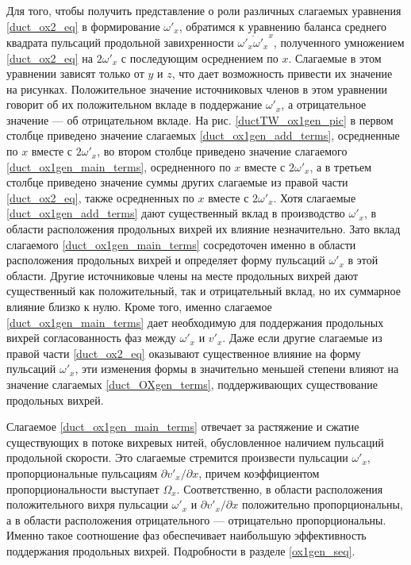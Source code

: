 Для того, чтобы получить представление о роли различных слагаемых уравнения \eqref{duct_ox2_eq} в формирование $\omega'_x$, обратимся к уравнению баланса среднего квадрата пульсаций продольной завихренности $\overline{\omega'_x \omega'_x}^x$, полученного умножением \eqref{duct_ox2_eq} на $2\omega'_x$ с последующим осреднением по $x$. Слагаемые в этом уравнении зависят только от $y$ и $z$, что дает возможность привести их значение на рисунках. Положительное значение источниковых членов в этом уравнении говорит об их положительном вкладе в поддержание $\omega'_x$, а отрицательное значение --- об отрицательном вкладе. На рис. \ref{ductTW_ox1gen_pic} в первом столбце приведено значение слагаемых \eqref{duct_ox1gen_add_terms}, осредненные по $x$ вместе с $2\omega'_x$, во втором столбце приведено значение слагаемого \eqref{duct_ox1gen_main_terms}, осредненного по $x$ вместе с $2\omega'_x$, а в третьем столбце приведено значение суммы других слагаемые из правой части \eqref{duct_ox2_eq}, также осредненных по $x$ вместе с $2\omega'_x$. Хотя слагаемые \eqref{duct_ox1gen_add_terms} дают существенный вклад в производство $\omega'_x$, в области расположения продольных вихрей их влияние незначительно. Зато вклад слагаемого \eqref{duct_ox1gen_main_terms} сосредоточен именно в области расположения продольных вихрей и определяет форму пульсаций $\omega'_x$ в этой области. Другие источниковые члены на месте продольных вихрей дают существенный как положительный, так и отрицательный вклад, но их суммарное влияние близко к нулю. Кроме того, именно слагаемое \eqref{duct_ox1gen_main_terms} дает необходимую для поддержания продольных вихрей согласованность фаз между $\omega'_x$ и $v'_x$. Даже если другие слагаемые из правой части \eqref{duct_ox2_eq} оказывают существенное влияние на форму пульсаций $\omega'_x$, эти изменения формы в значительно меньшей степени влияют на значение слагаемых \eqref{duct_OXgen_terms}, поддерживающих существование продольных вихрей.

Слагаемое \eqref{duct_ox1gen_main_terms} отвечает за растяжение и сжатие существующих в потоке вихревых нитей, обусловленное наличием пульсаций продольной скорости. Это слагаемые стремится произвести пульсации $\omega'_x$, пропорциональные пульсациям $\partial v'_x / \partial x$, причем коэффициентом пропорциональности выступает $\Omega_x$. Соответственно, в области расположения положительного вихря пульсации $\omega'_x$ и $\partial v'_x / \partial x$ положительно пропорциональны, а в области расположения отрицательного --- отрицательно пропорциональны. Именно такое соотношение фаз обеспечивает наибольшую эффективность поддержания продольных вихрей. Подробности в разделе \ref{ox1gen_seq}. 

